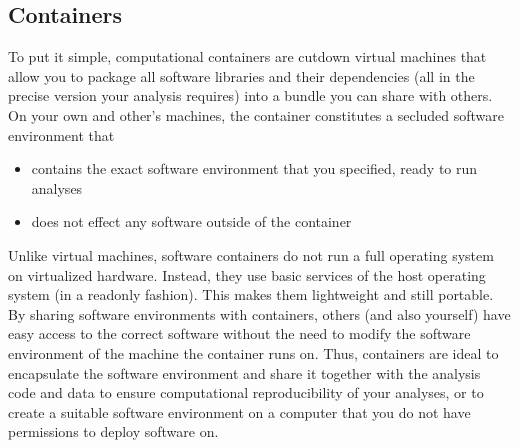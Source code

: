 \subsection{Containers}
\label{\detokenize{basics/101-133-containersrun:containers}}\label{\detokenize{basics/101-133-containersrun:index-0}}
\sphinxAtStartPar
To put it simple, computational containers are cut\sphinxhyphen{}down virtual machines that
allow you to package all software libraries and their dependencies (all in the
precise version your analysis requires) into a bundle you can share with
others. On your own and other’s machines, the container constitutes a secluded
software environment that
\begin{itemize}
\item {} 
\sphinxAtStartPar
contains the exact software environment that you specified, ready to run
analyses

\item {} 
\sphinxAtStartPar
does not effect any software outside of the container

\end{itemize}

\sphinxAtStartPar
Unlike virtual machines, software containers do not run a full operating
system on virtualized hardware. Instead, they use basic services of the host operating system
(in a read\sphinxhyphen{}only fashion). This makes them
lightweight and still portable. By sharing software environments with containers,
others (and also yourself) have easy access to the correct software
without the need to modify the software environment of the machine the
container runs on. Thus, containers are ideal to encapsulate the software
environment and share it together with the analysis code and data to ensure
computational reproducibility of your analyses, or to create a suitable
software environment on a computer that you do not have permissions to deploy
software on.

